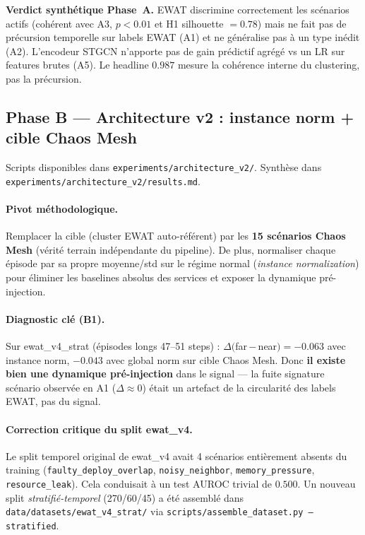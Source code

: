 \textbf{Verdict synthétique Phase~A.} EWAT discrimine correctement les scénarios actifs
(cohérent avec A3, $p < 0.01$ et H1 silhouette $= 0.78$) mais ne fait pas de précursion
temporelle sur labels EWAT (A1) et ne généralise pas à un type inédit (A2). L'encodeur STGCN
n'apporte pas de gain prédictif agrégé vs un LR sur features brutes (A5). Le headline $0.987$
mesure la cohérence interne du clustering, pas la précursion.

\subsection{Phase B --- Architecture v2 : instance norm + cible Chaos Mesh}
\label{sec:archv2}

Scripts disponibles dans \texttt{experiments/architecture\_v2/}. Synthèse dans
\texttt{experiments/architecture\_v2/results.md}.

\paragraph{Pivot méthodologique.} Remplacer la cible (cluster EWAT auto-référent) par les
\textbf{15 scénarios Chaos Mesh} (vérité terrain indépendante du pipeline). De plus, normaliser
chaque épisode par sa propre moyenne/std sur le régime normal (\emph{instance normalization})
pour éliminer les baselines absolus des services et exposer la dynamique pré-injection.

\paragraph{Diagnostic clé (B1).} Sur ewat\_v4\_strat (épisodes longs 47--51 steps) :
$\Delta($far\,$-$\,near$)= -0.063$ avec instance norm, $-0.043$ avec global norm sur cible
Chaos Mesh. Donc \textbf{il existe bien une dynamique pré-injection} dans le signal --- la
fuite signature scénario observée en A1 ($\Delta \approx 0$) était un artefact de la
circularité des labels EWAT, pas du signal.

\paragraph{Correction critique du split ewat\_v4.}
Le split temporel original de ewat\_v4 avait 4 scénarios entièrement absents du training
(\texttt{faulty\_deploy\_overlap}, \texttt{noisy\_neighbor}, \texttt{memory\_pressure},
\texttt{resource\_leak}). Cela conduisait à un test AUROC trivial de $0.500$. Un nouveau
split \emph{stratifié-temporel} (270/60/45) a été assemblé dans
\texttt{data/datasets/ewat\_v4\_strat/} via \texttt{scripts/assemble\_dataset.py --stratified}.


